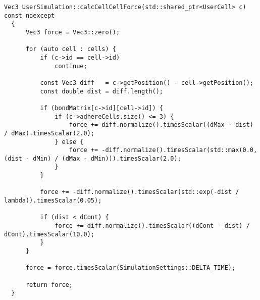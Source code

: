 \documentclass[vipdfmx,a4paper,11pt]{jsarticle}
\begin{document}
\begin{lstlisting}[caption=calcCellCellForce()]
  Vec3 UserSimulation::calcCellCellForce(std::shared_ptr<UserCell> c) const noexcept
  {
      Vec3 force = Vec3::zero();
  
      for (auto cell : cells) {
          if (c->id == cell->id)
              continue;
  
          const Vec3 diff   = c->getPosition() - cell->getPosition();
          const double dist = diff.length();
  
          if (bondMatrix[c->id][cell->id]) {
              if (c->adhereCells.size() <= 3) {
                  force += diff.normalize().timesScalar((dMax - dist) / dMax).timesScalar(2.0);
              } else {
                  force += -diff.normalize().timesScalar(std::max(0.0, (dist - dMin) / (dMax - dMin))).timesScalar(2.0);
              }
          }
  
          force += -diff.normalize().timesScalar(std::exp(-dist / lambda)).timesScalar(0.05);
  
          if (dist < dCont) {
              force += diff.normalize().timesScalar((dCont - dist) / dCont).timesScalar(10.0);
          }
      }
  
      force = force.timesScalar(SimulationSettings::DELTA_TIME);
  
      return force;
  }
\end{lstlisting}
\end{document}
